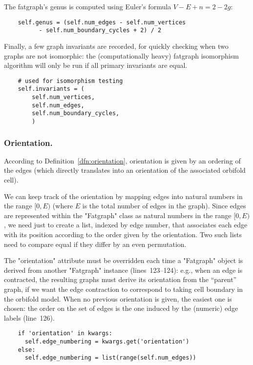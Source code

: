The fatgraph's genus is computed using Euler's formula $V-E+n = 2-2g$:
\begin{lstlisting}
    self.genus = (self.num_edges - self.num_vertices
          - self.num_boundary_cycles + 2) / 2

\end{lstlisting}
Finally, a few graph invariants are recorded, for quickly
checking when two graphs are not isomorphic: the (computationally
heavy) fatgraph isomorphism algorithm will only be run if all primary
invariants are equal.
\begin{lstlisting}
    # used for isomorphism testing
    self.invariants = (
        self.num_vertices,
        self.num_edges,
        self.num_boundary_cycles,
        )

\end{lstlisting}


\subsubsection{Orientation.}
According to Definition~\ref{dfn:orientation}, orientation is given by an
ordering of the edges (which directly translates into an orientation
of the associated orbifold cell).

We can keep track of the orientation by mapping edges into natural
numbers in the range $[0, E)$ (where $E$ is the total number of edges
in the graph).  Since edges are represented within the "Fatgraph"
class as natural numbers in the range $[0, E)$, we need just to create
a list, indexed by edge number, that associates each edge with its
position according to the order given by the orientation.  Two such
lists need to compare equal if they differ by an even permutation.

The "orientation" attribute must be overridden each time a "Fatgraph"
object is derived from another "Fatgraph" instance (lines~123--124): e.g., when an edge
is contracted, the resulting graphs must derive its orientation from
the ``parent'' graph, if we want the edge contraction to correspond to
taking cell boundary in the orbifold model.  When no previous
orientation is given, the easiest one is chosen: the order on the set
of edges is the one induced by the (numeric) edge labels (line~126).
\begin{lstlisting}
    if 'orientation' in kwargs:
      self.edge_numbering = kwargs.get('orientation')
    else:
      self.edge_numbering = list(range(self.num_edges))

\end{lstlisting}

